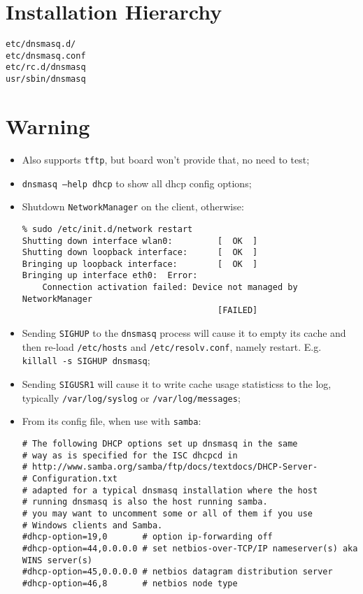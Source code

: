 \documentclass[a4paper]{report}
\begin{document}
\section{Installation Hierarchy}
\begin{lstlisting}
etc/dnsmasq.d/
etc/dnsmasq.conf
etc/rc.d/dnsmasq
usr/sbin/dnsmasq
\end{lstlisting}
\section{Warning}
\begin{itemize}
    \item Also supports {\tt tftp}, but board won't provide that, no need to test;
    \item {\tt dnsmasq --help dhcp} to show all dhcp config options;
    \item Shutdown {\tt NetworkManager} on the client, otherwise:
\begin{lstlisting}
% sudo /etc/init.d/network restart
Shutting down interface wlan0:         [  OK  ]
Shutting down loopback interface:      [  OK  ]
Bringing up loopback interface:        [  OK  ]
Bringing up interface eth0:  Error: 
    Connection activation failed: Device not managed by NetworkManager
                                       [FAILED]
\end{lstlisting}
    \item Sending {\tt SIGHUP} to the {\tt dnsmasq} process will cause it to 
          empty its cache and then re-load {\tt /etc/hosts} and {\tt /etc/resolv.conf}, 
          namely restart. E.g. {\tt killall -s SIGHUP dnsmasq};
    \item Sending {\tt SIGUSR1} will cause it to write cache usage statisticss to the 
          log, typically {\tt /var/log/syslog} or {\tt /var/log/messages};
    \item From its config file, when use with {\tt samba}:
\begin{lstlisting}
# The following DHCP options set up dnsmasq in the same
# way as is specified for the ISC dhcpcd in
# http://www.samba.org/samba/ftp/docs/textdocs/DHCP-Server-
# Configuration.txt
# adapted for a typical dnsmasq installation where the host
# running dnsmasq is also the host running samba.
# you may want to uncomment some or all of them if you use 
# Windows clients and Samba.
#dhcp-option=19,0       # option ip-forwarding off
#dhcp-option=44,0.0.0.0 # set netbios-over-TCP/IP nameserver(s) aka WINS server(s)
#dhcp-option=45,0.0.0.0 # netbios datagram distribution server
#dhcp-option=46,8       # netbios node type
\end{lstlisting}
\end{itemize}
\end{document}
